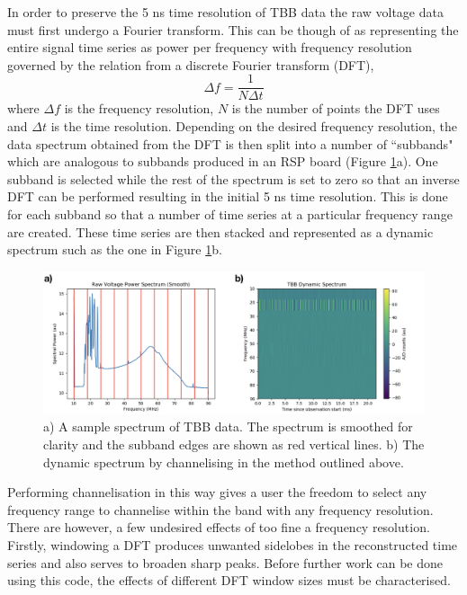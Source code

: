 In order to preserve the 5 ns time resolution of TBB data the raw voltage data must first undergo a Fourier transform. This can be though of as representing the entire signal time series as power per frequency with frequency resolution governed by the relation from a discrete Fourier transform (DFT),
$$\Delta f = \frac{1}{N\Delta t}$$
where $\Delta f$ is the frequency resolution, $N$ is the number of points the DFT uses and $\Delta t$ is the time resolution. Depending on the desired frequency resolution, the data spectrum obtained from the DFT is then split into a number of ``subbands" which are analogous to subbands produced in an RSP board (Figure \ref{fig:subbands_pspec}a). One subband is selected while the rest of the spectrum is set to zero so that an inverse DFT can be performed resulting in the initial 5 ns time resolution. This is done for each subband so that a number of time series at a particular frequency range are created. These time series are then stacked and represented as a dynamic spectrum such as the one in Figure \ref{fig:subbands_pspec}b.

\begin{figure}
    \centering
    \includegraphics[width=\columnwidth]{Images/TBB_spectra.png}
    \caption[Spectrum of TBB data and subbands]{a) A sample spectrum of TBB data. The spectrum is smoothed for clarity and the subband edges are shown as red vertical lines. b) The dynamic spectrum by channelising in the method outlined above.}
    \label{fig:subbands_pspec}
\end{figure}


Performing channelisation in this way gives a user the freedom to select any frequency range to channelise within the band with any frequency resolution. There are however, a few undesired effects of too fine a frequency resolution. Firstly, windowing a DFT produces unwanted sidelobes in the reconstructed time series and also serves to broaden sharp peaks. Before further work can be done using this code, the effects of different DFT window sizes must be characterised.

